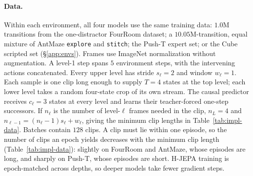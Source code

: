 \paragraph{Data.} Within each environment, all four models use the same training
data: $1.0$M transitions from the one-distractor FourRoom dataset; a $10.05$M-transition,
equal mixture of AntMaze \texttt{explore} and \texttt{stitch}; the Push-T expert set;
or the Cube scripted set (\S\ref{app:envs}). Frames use ImageNet
normalization without augmentation. A level-1 step spans $5$ environment steps,
with the intervening actions concatenated. Every upper level has stride
$s_\ell=2$ and window $w_\ell=1$. Each sample is one clip long enough to supply
$T=4$ states at the top level; each lower level takes a random four-state crop of
its own stream. The causal predictor receives $c_\ell=3$ states at every level and learns their
teacher-forced one-step successors. If $n_\ell$ is the number of level-$\ell$
frames needed in the clip, $n_L=4$ and
$n_{\ell-1}=(n_\ell-1)s_\ell+w_\ell$, giving the minimum clip lengths in
Table~\ref{tab:impl-data}. Batches contain $128$ clips. A clip must lie within one
episode, so the number of clips an epoch yields decreases with the minimum clip length
(Table~\ref{tab:impl-data}): slightly on FourRoom and AntMaze, whose episodes are
long, and sharply on Push-T, whose episodes are short. H-JEPA training is
epoch-matched across depths, so deeper models take fewer gradient steps.

